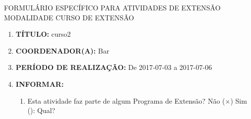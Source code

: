 \documentclass[12pt,a4paper,oneside]{article}%
\begin{document}
%
\normalsize%
\fontfamily{\sfdefault}\selectfont%
\begin{flushright}%
FORMULÁRIO ESPECÍFICO PARA ATIVIDADES DE EXTENSÃO \\%
MODALIDADE CURSO DE EXTENSÃO%
\end{flushright}%
\hrulefill%
\begin{enumerate}%
\footnotesize%
\item%
\textbf{TÍTULO: }%
curso2%
\item%
\textbf{COORDENADOR(A): }%
Bar%
\item%
\textbf{PERÍODO DE REALIZAÇÃO: }%
De 2017{-}07{-}03 a 2017{-}07{-}06%
\item%
\textbf{INFORMAR: }%
\begin{mdframed}[innertopmargin=5pt, innerleftmargin=3pt, innerrightmargin=3pt]%
\begin{enumerate}%
\scriptsize%
\item%
Esta atividade faz parte de algum Programa de Extensão? %
Não ($\times$) Sim (): Qual? %


\end{enumerate}
\end{mdframed}
\end{enumerate}
\end{document}
